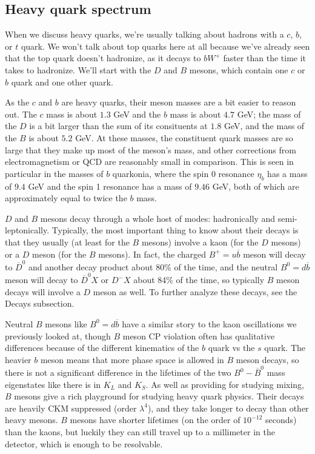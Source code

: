 \documentclass[11pt, oneside]{article}   	%
\theoremstyle{definition}
\numberwithin{equation}{subsection}		%
\begin{document}
\subsection{Heavy quark spectrum}

When we discuss heavy quarks, we're usually talking about hadrons with a $c$, $b$, or $t$ quark. We won't talk about top quarks here at 
all because we've already seen that the top quark doesn't hadronize, as it decays to $b W^+$ faster than the time it takes to hadronize. 
We'll start with the $D$ and $B$ mesons, which contain one $c$ or $b$ quark and one other quark. 

As the $c$ and $b$ are heavy quarks, their meson masses are a bit easier to reason out. The $c$ mass is about $1.3$ GeV and the 
$b$ mass is about $4.7$ GeV; the mass of the $D$ is a bit larger than the sum of its consituents at $1.8$ GeV, and the 
mass of the $B$ is about $5.2$ GeV. At these masses, the constituent quark masses are so large that they make up most of the meson's 
mass, and other corrections from electromagnetism or QCD are reasonably small in comparison. 
This is seen in particular in the masses of $b$ quarkonia, where the spin 0 resonance $\eta_b$ has a mass of $9.4$ GeV and the 
spin 1 resonance has a mass of $9.46$ GeV, both of which are approximately equal to twice the $b$ mass. 

$D$ and $B$ mesons decay through a whole host of modes: hadronically and semi-leptonically. Typically, the most important thing to 
know about their decays is that they usually (at least for the $B$ mesons) involve a kaon (for the $D$ mesons) or a $D$ meson (for 
the $B$ mesons). In fact, the charged $B^+ = u\overline b$ meson will decay to $\overline D^0$ and another decay product about 
80\% of the time, and the neutral $B^0 = d\overline b$ meson will decay to $\overline D^0 X$ or $D^- X$ about 84\% of the time, so 
typically $B$ meson decays will involve a $D$ meson as well. To further analyze these decays, see the Decays subsection. 

Neutral $B$ mesons like $B^0 = d\overline b$ have a similar story to the kaon oscillations we previously looked at, 
though $B$ meson CP violation often has qualitative differences because of the different 
kinematics of the $b$ quark vs the $s$ quark. The heavier $b$ meson means that more phase space is allowed in $B$ meson decays, so 
there is not a significant difference in the lifetimes of the two $B^0-\overline B^0$ mass eigenstates like there is in $K_L$ and $K_S$. 
As well as providing for studying mixing, $B$ mesons give a rich playground for studying heavy quark physics. 
Their decays are heavily CKM suppressed (order $\lambda^4$), and they take longer to decay than other heavy mesons. 
$B$ mesons have shorter lifetimes (on the order of $10^{-12}$ seconds) than the kaons, but luckily they can still travel up to a 
millimeter in the detector, which is enough to be resolvable. 
\end{document}
